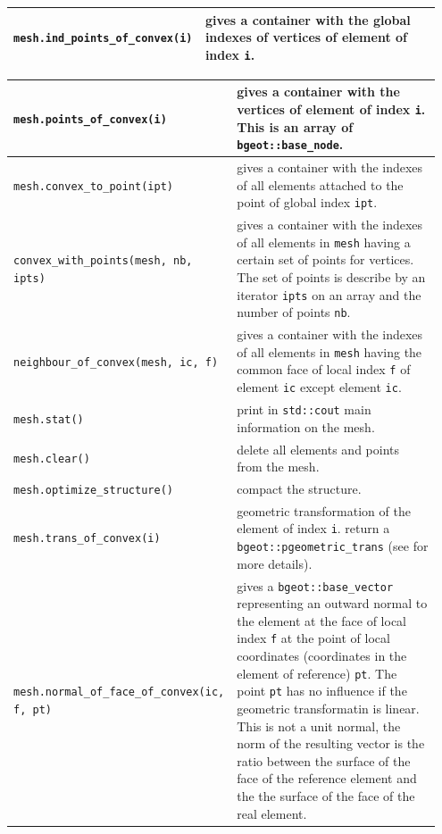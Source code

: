 \documentclass[11pt,a4paper]{article}
\begin{document}
\begin{center}
\begin{tabular}{|m{0.4\linewidth}|m{0.55\linewidth}|}
  {\tt mesh.ind\_points\_of\_convex(i)} & gives a container with the global indexes of  vertices of element of index {\tt i}.\\ \hline

\end{tabular}
\begin{tabular}{|m{0.4\linewidth}|m{0.55\linewidth}|}\hline

  {\tt mesh.points\_of\_convex(i)} & gives a container with the  vertices of element of index {\tt i}. This is an array of {\tt bgeot::base\_node}.\\ \hline

  {\tt mesh.convex\_to\_point(ipt)} & gives a container with the indexes of all elements attached to the point of global index {\tt ipt}.\\ \hline

  {\tt convex\_with\_points(mesh, nb, ipts) } & gives a container with the indexes of all elements in {\tt mesh} having a certain set of points for vertices. The set of points is describe by an iterator {\tt ipts} on an array and the number of points {\tt nb}.\\ \hline

  {\tt neighbour\_of\_convex(mesh, ic, f)} & gives a container with the indexes of all elements in {\tt mesh} having the common face of local index {\tt f} of element {\tt ic} except element {\tt ic}. \\ \hline

  {\tt mesh.stat()} & print in {\tt std::cout} main information on the mesh. \\ \hline

  {\tt mesh.clear()} & delete all elements and points from the mesh. \\ \hline

  {\tt mesh.optimize\_structure()} & compact the structure. \\ \hline

  {\tt mesh.trans\_of\_convex(i)} & geometric transformation of the element of index {\tt i}. return a {\tt bgeot::pgeometric\_trans} (see \cite{BAS_COMP} for more details).  \\ \hline

  {\tt mesh.normal\_of\_face\_of\_convex(ic, f, pt)} & gives a {\tt bgeot::base\_vector} representing an outward normal to the element at the face of local index {\tt f} at the point of local coordinates (coordinates in the element of reference) {\tt pt}. The point {\tt pt} has no influence if the geometric transformatin is linear. This is not a unit normal, the norm of the resulting vector is the ratio between the surface of the face of the reference element and the the surface of the face of the real element. \\ \hline

\end{tabular} \end{center}
\end{document}
